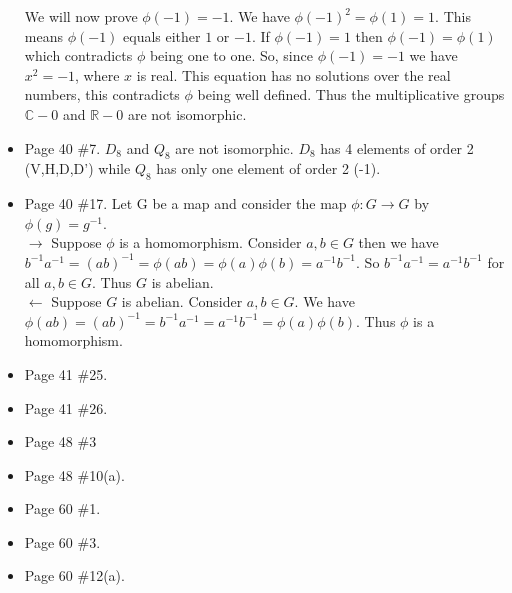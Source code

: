 \documentclass[12pt]{report}
\begin{document}
\begin{itemize}
      We will now prove $\phi(-1) = -1$. We have $\phi(-1)^2 = \phi(1) = 1$.
      This means $\phi(-1)$ equals either $1$ or $-1$. If $\phi(-1) = 1$ then
      $\phi(-1) = \phi(1)$ which contradicts $\phi$ being one to one. So, since
      $\phi(-1) = -1$ we have $x^2 = -1$, where $x$ is real. This equation has
      no solutions over the real numbers, this contradicts $\phi$ being well
      defined. Thus the multiplicative groups $\mathbb{C} -{0}$ and
      $\mathbb{R} -{0}$ are not isomorphic.\\

\item Page 40 \#7. $D_8$ and $Q_8$ are not isomorphic. $D_8$ has 4 elements of
      order 2 (V,H,D,D') while $Q_8$ has only one element of order 2 (-1).\\

\item Page 40 \#17. Let G be a map and consider the map $\phi:G \to G$ by
      $\phi(g) = g^{-1}$.\\

      $\rightarrow$ Suppose $\phi$ is a homomorphism. Consider $a,b \in G$
      then we have $b^{-1}a^{-1} = (ab)^{-1} = \phi(ab) = \phi(a)\phi(b) =
      a^{-1}b^{-1}$. So $b^{-1}a^{-1} = a^{-1}b^{-1}$ for all $a,b \in G$. Thus
      $G$ is abelian.\\

      $\leftarrow$ Suppose $G$ is abelian. Consider $a,b \in G$. We have
      $\phi(ab) = (ab)^{-1} = b^{-1}a^{-1} = a^{-1}b^{-1} = \phi(a)\phi(b)$.
      Thus $\phi$ is a homomorphism.

\item Page 41 \#25.

\item Page 41 \#26.

\item Page 48 \#3

\item Page 48 \#10(a).

\item Page 60 \#1.

\item Page 60 \#3.

\item Page 60 \#12(a).
\end{itemize}
\end{document}
